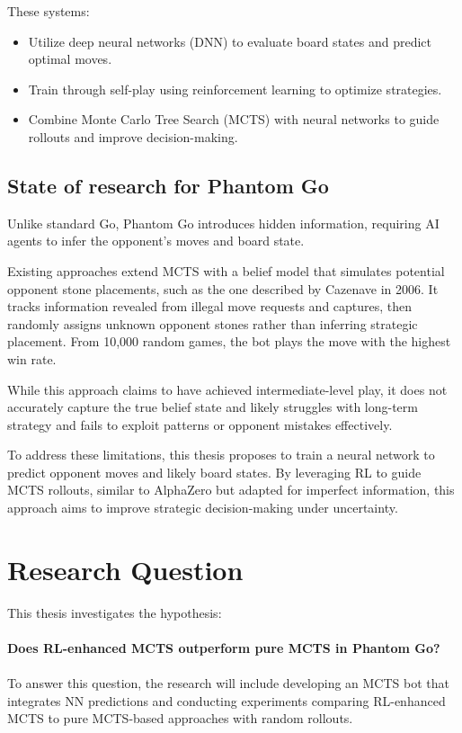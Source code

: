 \documentclass[12pt,oneside,openright]{article}
\begin{document}
These systems:
\begin{itemize}
    \item Utilize deep neural networks (DNN) to evaluate board states and predict optimal moves.
    \item Train through self-play using reinforcement learning to optimize strategies.
    \item Combine Monte Carlo Tree Search (MCTS) with neural networks to guide rollouts and improve decision-making.
\end{itemize}

\subsection{State of research for Phantom Go}

Unlike standard Go, Phantom Go introduces hidden information, requiring AI agents to infer the opponent’s moves and board state.

Existing approaches extend MCTS with a belief model that simulates potential opponent stone placements, such as the one described by Cazenave in 2006\cite{Cazenave2006}.
It tracks information revealed from illegal move requests and captures, then randomly assigns unknown opponent stones rather than inferring strategic placement. From 10,000 random games, the bot plays the move with the highest win rate.

While this approach claims to have achieved intermediate-level play, it does not accurately capture the true belief state and likely struggles with long-term strategy and fails to exploit patterns or opponent mistakes effectively.

To address these limitations, this thesis proposes to train a neural network to predict opponent moves and likely board states. By leveraging RL to guide MCTS rollouts, similar to AlphaZero but adapted for imperfect information, this approach aims to improve strategic decision-making under uncertainty.

\section{Research Question}

This thesis investigates the hypothesis:
\\
\\
\textbf{Does RL-enhanced MCTS outperform pure MCTS in Phantom Go?}
\\
\\
To answer this question, the research will include developing an MCTS bot that integrates NN predictions and conducting experiments comparing RL-enhanced MCTS to pure MCTS-based approaches with random rollouts.
\end{document}
